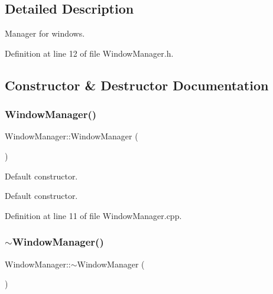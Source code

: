 \subsection{Detailed Description}


 



 

Manager for windows. 

Definition at line 12 of file Window\+Manager.\+h.



\subsection{Constructor \& Destructor Documentation}
\mbox{\label{class_window_manager_a3a283b34c19aaa20296befaabad4d29b}} 
\subsubsection{\texorpdfstring{Window\+Manager()}{WindowManager()}}
{\footnotesize\ttfamily Window\+Manager\+::\+Window\+Manager (\begin{DoxyParamCaption}{ }\end{DoxyParamCaption})}



Default constructor. 







 

Default constructor. 

Definition at line 11 of file Window\+Manager.\+cpp.

\mbox{\label{class_window_manager_a19fd6e41c42760af82460d9851780d82}} 
\subsubsection{\texorpdfstring{$\sim$\+Window\+Manager()}{~WindowManager()}}
{\footnotesize\ttfamily Window\+Manager\+::$\sim$\+Window\+Manager (\begin{DoxyParamCaption}{ }\end{DoxyParamCaption})}



